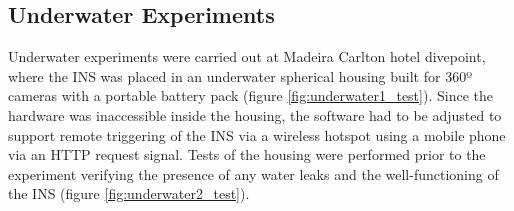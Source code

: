 \newpage

\subsection{Underwater Experiments}

Underwater experiments were carried out at Madeira Carlton hotel divepoint, where the INS was placed in an underwater spherical housing built for 360º cameras with a portable battery pack (figure \ref{fig:underwater1_test}). Since the hardware was inaccessible inside the housing, the software had to be adjusted to support remote triggering of the INS via a wireless hotspot using a mobile phone via an HTTP request signal. Tests of the housing were performed prior to the experiment verifying the presence of any water leaks and the well-functioning of the INS (figure \ref{fig:underwater2_test}).

